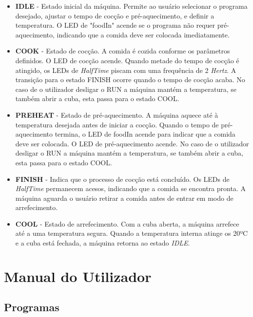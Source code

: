 \documentclass[a4paper, 11pt, onecolumn, oneside]{report}
\begin{document}
\begin{itemize}
    \item \textbf{IDLE} - Estado inicial da máquina. Permite ao usuário selecionar o programa desejado, ajustar o tempo de cocção e pré-aquecimento, e definir a temperatura. O LED de "foodIn" acende se o programa não requer pré-aquecimento, indicando que a comida deve ser colocada imediatamente.
    
    \item \textbf{COOK} - Estado de cocção. A comida é cozida conforme os parâmetros definidos. O LED de cocção acende. Quando metade do tempo de cocção é atingido, os LEDs de \textit{HalfTime} piscam com uma frequência de 2 \textit{Hertz}. A transição para o estado FINISH ocorre quando o tempo de cocção acaba. No caso de o utilizador desligar o RUN a máquina mantém a temperatura, se também abrir a cuba, esta passa para o estado COOL.

    \item \textbf{PREHEAT} - Estado de pré-aquecimento. A máquina aquece até à temperatura desejada antes de iniciar a cocção. Quando o tempo de pré-aquecimento termina, o LED de foodIn acende para indicar que a comida deve ser colocada. O LED de pré-aquecimento acende. No caso de o utilizador desligar o RUN a máquina mantém a temperatura, se também abrir a cuba, esta passa para o estado COOL.

    \item \textbf{FINISH} - Indica que o processo de cocção está concluído. Os LEDs de \textit{HalfTime} permanecem acesos, indicando que a comida se encontra pronta. A máquina aguarda o usuário retirar a comida antes de entrar em modo de arrefecimento.

    \item \textbf{COOL} - Estado de arrefecimento. Com a cuba aberta, a máquina arrefece até a uma temperatura segura. Quando a temperatura interna atinge os 20ºC e a cuba está fechada, a máquina retorna ao estado \textit{IDLE}.
\end{itemize}

\chapter{Manual do Utilizador}
\label{chap.manualUtilizador}
\section{Programas}
\end{document}
